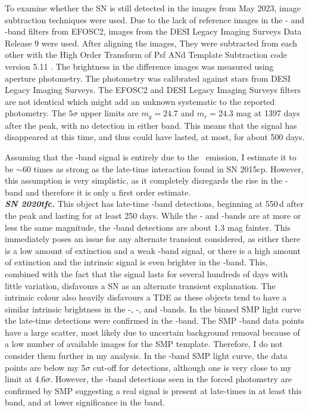 \documentclass[a4paper,oneside,12pt, class=Latex/Classes/PhDthesisPSnPDF, crop=false]{standalone}
\begin{document}
To examine whether the SN is still detected in the images from May 2023, image subtraction techniques were used. Due to the lack of reference images in the \ztfg- and \ztfr-band filters from EFOSC2, images from the DESI Legacy Imaging Surveys Data Release 9 \citep{DESI-Legacy_Imaging_Surveys} were used. After aligning the images, They were subtracted from each other with the High Order Transform of Psf ANd Template Subtraction code version 5.11 \citep[\textsc{hotpants};][]{HOTPANTS}. The brightness in the difference images was measured using aperture photometry. The photometry was calibrated against stars from DESI Legacy Imaging Surveys. The EFOSC2 and DESI Legacy Imaging Surveys filters are not identical which might add an unknown systematic to the reported photometry. The $5\sigma$ upper limits are $m_g = 24.7$ and $m_r = 24.3$ mag at 1397 days after the peak, with no detection in either band. This means that the signal has disappeared at this time, and thus could have lasted, at most, for about 500 days.

Assuming that the \ztfr-band signal is entirely due to the \Halpha~emission, I estimate it to be $\sim$60 times as strong as the late-time interaction found in SN 2015cp. However, this assumption is very simplistic, as it completely disregards the rise in the \ztfi-band and therefore it is only a first order estimate.\\


\textit{\textbf{SN 2020tfc.}}
This object has late-time \ztfg\ztfr\ztfi-band detections, beginning at 550\,d after the peak and lasting for at least 250 days. While the \ztfr- and \ztfi-bands are at more or less the same magnitude, the \ztfg-band detections are about 1.3 mag fainter. This immediately poses an issue for any alternate transient considered, as either there is a low amount of extinction and a weak \ztfg-band signal, or there is a high amount of extinction and the intrinsic signal is even brighter in the \ztfi-band. This, combined with the fact that the signal lasts for several hundreds of days with little variation, disfavours a SN as an alternate transient explanation. The intrinsic colour also heavily disfavours a TDE as these objects tend to have a similar intrinsic brightness in the \ztfg-, \ztfr-, and \ztfi-bands. In the binned SMP light curve the late-time detections were confirmed in the \ztfg-band. The SMP \ztfi-band data points have a large scatter, most likely due to uncertain background removal because of a low number of available images for the SMP template. Therefore, I do not consider them further in my analysis. In the \ztfr-band SMP light curve, the data points are below my 5$\sigma$ cut-off for detections, although one is very close to my limit at 4.6$\sigma$. However, the \ztfg-band detections seen in the forced photometry are confirmed by SMP suggesting a real signal is present at late-times in at least this band, and at lower significance in the \ztfr band. 
\end{document}
